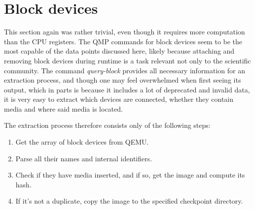 \section{Block devices}
This section again was rather trivial, even though it requires more computation than the CPU registers.
The QMP commands for block devices seem to be the most capable of the data points discussed here,
likely because attaching and removing block devices during runtime is a task relevant not only to the scientific community.
The command \emph{query-block} provides all necessary information for an extraction process,
and though one may feel overwhelmed when first seeing its output,
which in parts is because it includes a lot of deprecated and invalid data,
it is very easy to extract which devices are connected, whether they contain media and where said media is located.

The extraction process therefore consists only of the following steps:
\begin{enumerate}
    \item Get the array of block devices from QEMU.
    \item Parse all their names and internal identifiers.
    \item Check if they have media inserted, and if so, get the image and compute its hash.
    \item If it's not a duplicate, copy the image to the specified checkpoint directory.
\end{enumerate}

